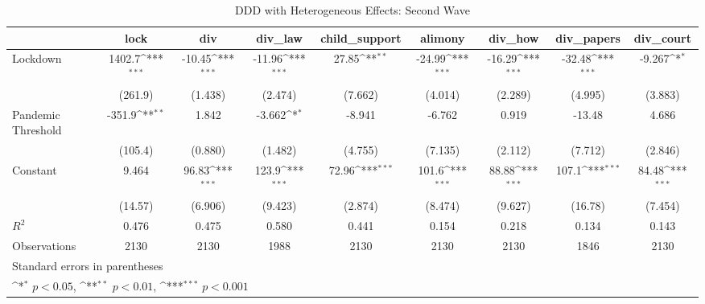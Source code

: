 \documentclass{article}
\begin{document}
{
\def\sym#1{\ifmmode^{#1}\else\(^{#1}\)\fi}
\begin{longtable}{l*{8}{c}}
\caption{DDD with Heterogeneous Effects: Second Wave}\\
\hline\hline\endfirsthead\hline\endhead\hline\endfoot\endlastfoot
                &\multicolumn{1}{c}{lock}&\multicolumn{1}{c}{div}&\multicolumn{1}{c}{div\_law}&\multicolumn{1}{c}{child\_support}&\multicolumn{1}{c}{alimony}&\multicolumn{1}{c}{div\_how}&\multicolumn{1}{c}{div\_papers}&\multicolumn{1}{c}{div\_court}\\
\hline
Lockdown        &   1402.7\sym{***}&   -10.45\sym{***}&   -11.96\sym{***}&    27.85\sym{**} &   -24.99\sym{***}&   -16.29\sym{***}&   -32.48\sym{***}&   -9.267\sym{*}  \\
                &  (261.9)         &  (1.438)         &  (2.474)         &  (7.662)         &  (4.014)         &  (2.289)         &  (4.995)         &  (3.883)         \\
Pandemic Threshold&   -351.9\sym{**} &    1.842         &   -3.662\sym{*}  &   -8.941         &   -6.762         &    0.919         &   -13.48         &    4.686         \\
                &  (105.4)         &  (0.880)         &  (1.482)         &  (4.755)         &  (7.135)         &  (2.112)         &  (7.712)         &  (2.846)         \\
Constant        &    9.464         &    96.83\sym{***}&    123.9\sym{***}&    72.96\sym{***}&    101.6\sym{***}&    88.88\sym{***}&    107.1\sym{***}&    84.48\sym{***}\\
                &  (14.57)         &  (6.906)         &  (9.423)         &  (2.874)         &  (8.474)         &  (9.627)         &  (16.78)         &  (7.454)         \\
\hline
\(R^{2}\)       &    0.476         &    0.475         &    0.580         &    0.441         &    0.154         &    0.218         &    0.134         &    0.143         \\
Observations    &     2130         &     2130         &     1988         &     2130         &     2130         &     2130         &     1846         &     2130         \\
\hline\hline
\multicolumn{9}{l}{\footnotesize Standard errors in parentheses}\\
\multicolumn{9}{l}{\footnotesize \sym{*} \(p<0.05\), \sym{**} \(p<0.01\), \sym{***} \(p<0.001\)}\\
\end{longtable}
}
\end{document}
